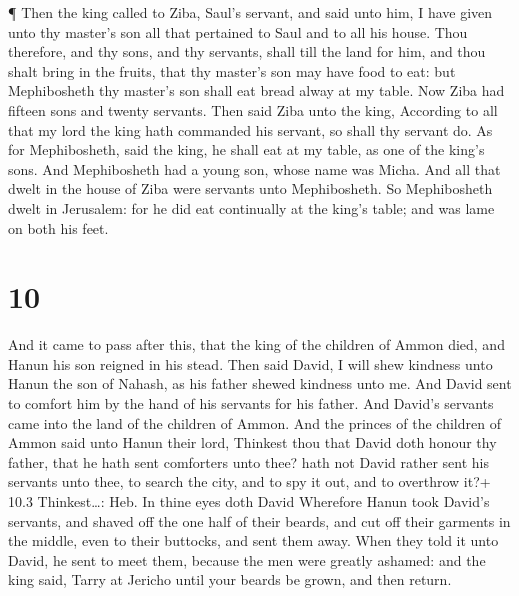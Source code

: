  ¶ Then the king called to Ziba, Saul's servant, and said
unto him, I have given unto thy master's son all that pertained to Saul
and to all his house.  Thou therefore, and thy sons, and
thy servants, shall till the land for him, and thou shalt bring in the
fruits, that thy master's son may have food to eat: but Mephibosheth thy
master's son shall eat bread alway at my table. Now Ziba had fifteen
sons and twenty servants.  Then said Ziba unto the king,
According to all that my lord the king hath commanded his servant, so
shall thy servant do. As for Mephibosheth, said the king, he shall eat
at my table, as one of the king's sons.  And Mephibosheth
had a young son, whose name was Micha. And all that dwelt in the house
of Ziba were servants unto Mephibosheth.  So Mephibosheth
dwelt in Jerusalem: for he did eat continually at the king's table; and
was lame on both his feet.

\hypertarget{section-9}{%
\section{10}\label{section-9}}

 And it came to pass after this, that the king of the
children of Ammon died, and Hanun his son reigned in his stead.
 Then said David, I will shew kindness unto Hanun the son of
Nahash, as his father shewed kindness unto me. And David sent to comfort
him by the hand of his servants for his father. And David's servants
came into the land of the children of Ammon.  And the
princes of the children of Ammon said unto Hanun their lord, Thinkest
thou that David doth honour thy father, that he hath sent comforters
unto thee? hath not David rather sent his servants unto thee, to search
the city, and to spy it out, and to overthrow it?+ 10.3 Thinkest\ldots:
Heb. In thine eyes doth David  Wherefore Hanun took David's
servants, and shaved off the one half of their beards, and cut off their
garments in the middle, even to their buttocks, and sent them away.
 When they told it unto David, he sent to meet them, because
the men were greatly ashamed: and the king said, Tarry at Jericho until
your beards be grown, and then return.

